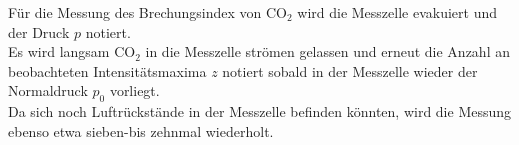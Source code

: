 Für die Messung des Brechungsindex von $\mathrm{CO_2}$ wird die Messzelle evakuiert und der Druck $p$ notiert.\\
Es wird langsam $\mathrm{CO_2}$ in die Messzelle strömen gelassen und erneut die Anzahl an beobachteten Intensitätsmaxima $z$ notiert sobald in der Messzelle wieder der Normaldruck $p_0$ vorliegt.
\\Da sich noch Luftrückstände in der Messzelle befinden könnten, wird die Messung ebenso etwa sieben-bis zehnmal wiederholt.
